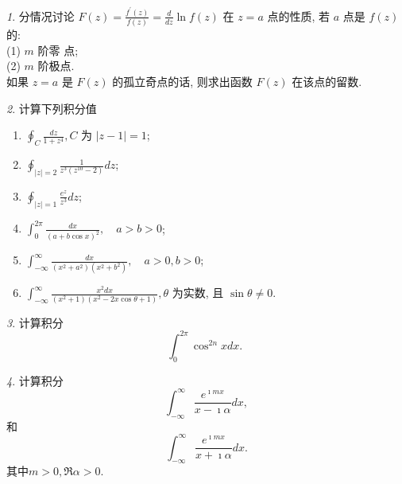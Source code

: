 \documentclass[11pt]{article}
\theoremstyle{remark}
\newtheorem{problem}{}
\begin{document}
  
\begin{problem}
分情况讨论 $F(z)=\frac{f^{\prime}(z)}{f(z)}=\frac{d}{d z} \ln f(z)$ 在 $z=a$ 点的性质, 
  若 $a$ 点是 $f(z)$ 的: 
  \\
  (1) $m$ 阶零 点; 
  \\
  (2) $m$ 阶极点.
  \\
  如果 $z=a$ 是 $F(z)$ 的孤立奇点的话, 则求出函数 $F(z)$ 在该点的留数.
\end{problem}


\begin{problem}
  计算下列积分值
  \begin{enumerate}
    \item $\oint_C \frac{d z}{1+z^4}, C$ 为 $|z-1|=1$;
    \item $\oint_{|z|=2} \frac{1}{z^3\left(z^{10}-2\right)} d z$;
    \item $\oint_{|z|=1} \frac{e^z}{z^3} d z$; 
    \item $\int_0^{2 \pi} \frac{d x}{(a+b \cos x)^2}, \quad a>b>0$;
    \item $\int_{-\infty}^{\infty} \frac{d x}{(x^2 + a^2)(x^2+b^2)}, \quad a>0, b>0$;
    \item $\int_{-\infty}^{\infty} \frac{x^2 d x}{\left(x^2+1\right)\left(x^2-2 x \cos \theta+1\right)}, \theta$ 为实数, 且 $\sin \theta \neq 0$.
  \end{enumerate}

\end{problem}


\begin{problem}
  计算积分
  $$
  \int_0^{2 \pi} \cos ^{2 n} x d x \text {. }
  $$
  \end{problem}
  
\begin{problem}
  计算积分
  $$
  \int_{-\infty}^{\infty} \frac{e^{\imath m x}}{x-\imath \alpha} d x,
  $$
  和
  $$
  \int_{-\infty}^{\infty} \frac{e^{\imath m x}}{x+\imath \alpha} d x.
  $$
  其中$m>0, \Re \alpha > 0$.
\end{problem}
\end{document}
